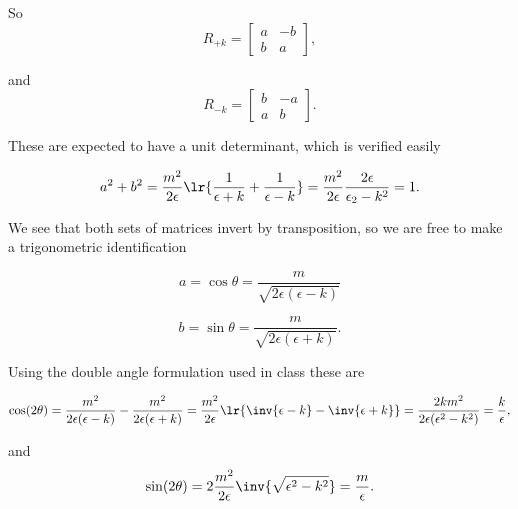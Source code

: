 So
\begin{dmath}\label{eqn:gradQuantumProblemSet4Problem3:380}
R_{+k} 
= 
\begin{bmatrix}
a & - b \\
b & a
\end{bmatrix},
\end{dmath}

and
\begin{dmath}\label{eqn:gradQuantumProblemSet4Problem3:400}
R_{-k} 
= 
\begin{bmatrix}
b & -a \\
a & b 
\end{bmatrix}.
\end{dmath}

These are expected to have a unit determinant, which is verified easily

\begin{dmath}\label{eqn:gradQuantumProblemSet4Problem3:420}
a^2 + b^2 
= 
\frac{m^2}{2 \epsilon}
\lr{
\frac{1}{\epsilon + k}
+
\frac{1}{\epsilon - k}
}
=
\frac{m^2}{2 \epsilon}
\frac{2 \epsilon}{\epsilon_2 - k^2}
= 1.
\end{dmath}

We see that both sets of matrices invert by transposition, so we are free to make a trigonometric identification

\begin{equation}\label{eqn:gradQuantumProblemSet4Problem3:440}
a = \cos\theta 
= 
\frac{m}{\sqrt{2\epsilon(\epsilon - k)}} 
\end{equation}

\begin{equation}\label{eqn:gradQuantumProblemSet4Problem3:460}
b = \sin\theta 
= 
\frac{m}{\sqrt{2\epsilon(\epsilon + k)}}.
\end{equation}

Using the double angle formulation used in class these are

\begin{dmath}\label{eqn:gradQuantumProblemSet4Problem3:480}
\cos(2 \theta) 
= 
\frac{m^2}{2\epsilon(\epsilon - k)} -
\frac{m^2}{2\epsilon(\epsilon + k)} 
=
\frac{m^2}{2 \epsilon} \lr{ \inv{\epsilon - k} - \inv{\epsilon + k} }
=
\frac{2 k m^2}{2 \epsilon (\epsilon^2 - k^2)}
=
\frac{k}{\epsilon},
\end{dmath}

and
\begin{dmath}\label{eqn:gradQuantumProblemSet4Problem3:500}
\sin(2 \theta) 
= 
2 \frac{m^2}{2 \epsilon} \inv{\sqrt{\epsilon^2 - k^2}}
= 
\frac{m}{\epsilon}.
\end{dmath}

